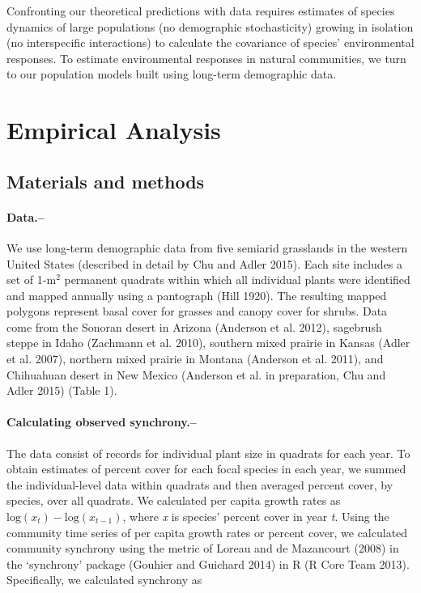 \documentclass[12pt,]{article}
\begin{document}
Confronting our theoretical predictions with data requires estimates of
species dynamics of large populations (no demographic stochasticity)
growing in isolation (no interspecific interactions) to calculate the
covariance of species' environmental responses. To estimate
environmental responses in natural communities, we turn to our
population models built using long-term demographic data.

\section{Empirical Analysis}\subsection{Materials and methods}

\paragraph{Data.--}\label{data.}

We use long-term demographic data from five semiarid grasslands in the
western United States (described in detail by Chu and Adler 2015). Each
site includes a set of 1-\(\text{m}^2\) permanent quadrats within which
all individual plants were identified and mapped annually using a
pantograph (Hill 1920). The resulting mapped polygons represent basal
cover for grasses and canopy cover for shrubs. Data come from the
Sonoran desert in Arizona (Anderson et al. 2012), sagebrush steppe in
Idaho (Zachmann et al. 2010), southern mixed prairie in Kansas (Adler et
al. 2007), northern mixed prairie in Montana (Anderson et al. 2011), and
Chihuahuan desert in New Mexico (Anderson et al. in preparation, Chu and
Adler 2015) (Table 1).

\paragraph{Calculating observed
synchrony.--}\label{calculating-observed-synchrony.}

The data consist of records for individual plant size in quadrats for
each year. To obtain estimates of percent cover for each focal species
in each year, we summed the individual-level data within quadrats and
then averaged percent cover, by species, over all quadrats. We
calculated per capita growth rates as
\(\text{log}(x_t) - \text{log}(x_{t-1})\), where \emph{x} is species'
percent cover in year \emph{t}. Using the community time series of per
capita growth rates or percent cover, we calculated community synchrony
using the metric of Loreau and {{de Mazancourt}} (2008) in the
`synchrony' package (Gouhier and Guichard 2014) in R (R Core Team 2013).
Specifically, we calculated synchrony as
\end{document}
